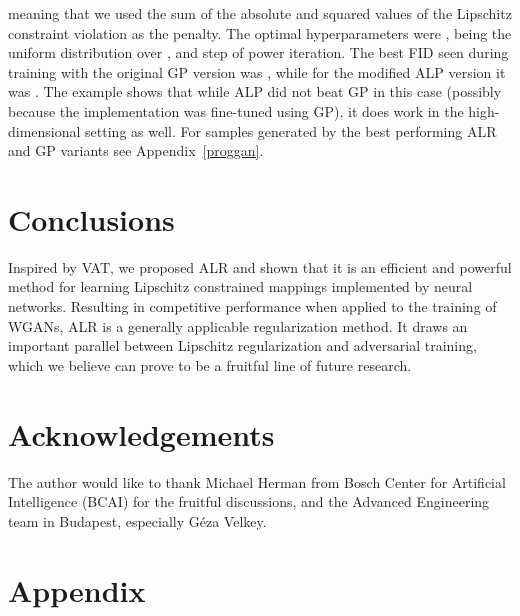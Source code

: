 \documentclass{article}
\begin{document}
meaning that we used the sum of the absolute and squared values of the Lipschitz constraint violation as the penalty. The optimal hyperparameters were ,  being the uniform distribution over ,  and  step of power iteration. The best FID seen during training with the original GP version was , while for the modified ALP version it was . The example shows that while ALP did not beat GP in this case (possibly because the implementation was fine-tuned using GP), it does work in the high-dimensional setting as well. For samples generated by the best performing ALR and GP variants see Appendix~\ref{proggan}.

\section{Conclusions}
\label{conclusions}
Inspired by VAT, we proposed ALR and shown that it is an efficient and powerful method for learning Lipschitz constrained mappings implemented by neural networks. Resulting in competitive performance when applied to the training of WGANs, ALR is a generally applicable regularization method. It draws an important parallel between Lipschitz regularization and adversarial training, which we believe can prove to be a fruitful line of future research.

\newpage


\section*{Acknowledgements}
The author would like to thank Michael Herman from Bosch Center for Artificial Intelligence (BCAI) for the fruitful discussions, and the Advanced Engineering team in Budapest, especially G\'eza Velkey.







\newpage

\appendix
\section{Appendix}
\end{document}
